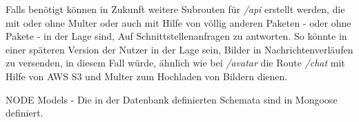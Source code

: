 Falls benötigt können in Zukunft weitere Subrouten für \textit{/api} erstellt werden, die mit oder ohne Multer oder auch mit Hilfe von völlig anderen Paketen - oder ohne Pakete - in der Lage sind, Auf Schnittstellenanfragen zu antworten. So könnte in einer späteren Version der Nutzer in der Lage sein, Bilder in Nachrichtenverläufen zu versenden, in diesem Fall würde, ähnlich wie bei \textit{/avatar} die Route \textit{/chat} mit Hilfe von AWS S3 und Multer zum Hochladen von Bildern dienen.



NODE
Models - Die in der Datenbank definierten Schemata sind in Mongoose definiert.